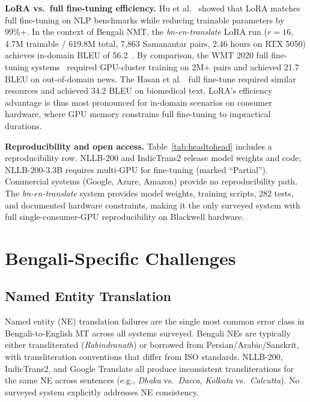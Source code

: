 \documentclass[conference]{IEEEtran}
\begin{document}
\textbf{LoRA vs.\ full fine-tuning efficiency.}
Hu et al.~\cite{hu2022lora} showed that LoRA matches full fine-tuning on NLP
benchmarks while reducing trainable parameters by 99\%+.
In the context of Bengali NMT, the \textit{bn-en-translate} LoRA run ($r=16$,
4.7M trainable / 619.8M total, 7,863 Samanantar pairs, 2.46 hours on RTX 5050)
achieves in-domain BLEU of 56.2~\cite{biswas2025bnentr}.
By comparison, the WMT 2020 full fine-tuning systems~\cite{barrault2020wmt}
required GPU-cluster training on 2M+ pairs and achieved 21.7 BLEU on
out-of-domain news.
The Hasan et al.~\cite{hasan2020low} full fine-tune required similar resources
and achieved 34.2 BLEU on biomedical text.
LoRA's efficiency advantage is thus most pronounced for in-domain scenarios
on consumer hardware, where GPU memory constrains full fine-tuning to impractical
durations.

\textbf{Reproducibility and open access.}
Table~\ref{tab:headtohead} includes a reproducibility row.
NLLB-200 and IndicTrans2 release model weights and code; NLLB-200-3.3B requires
multi-GPU for fine-tuning (marked ``Partial'').
Commercial systems (Google, Azure, Amazon) provide no reproducibility path.
The \textit{bn-en-translate} system provides model weights, training scripts,
282 tests, and documented hardware constraints, making it the only surveyed
system with full single-consumer-GPU reproducibility on Blackwell hardware.

\section{Bengali-Specific Challenges}
\label{sec:challenges}

\subsection{Named Entity Translation}

Named entity (NE) translation failures are the single most common
error class in Bengali-to-English MT across all systems surveyed.
Bengali NEs are typically either transliterated (\textit{Rabindranath})
or borrowed from Persian/Arabic/Sanskrit, with transliteration conventions
that differ from ISO standards.
NLLB-200, IndicTrans2, and Google Translate all produce inconsistent
transliterations for the same NE across sentences (e.g., \textit{Dhaka}
vs.\ \textit{Dacca}, \textit{Kolkata} vs.\ \textit{Calcutta}).
No surveyed system explicitly addresses NE consistency.
\end{document}
